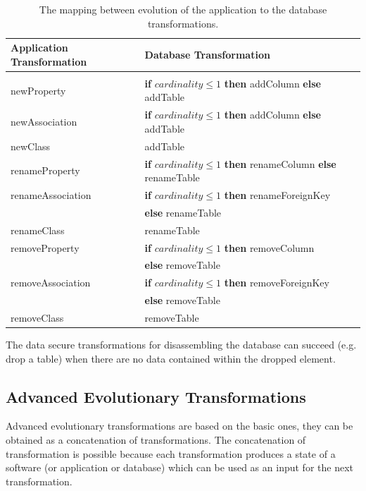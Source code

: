 \documentclass[runningheads]{comsis}
\begin{document}
\begin{table}
	\caption{The mapping between evolution of the application to the database transformations.}
	\label{tab:sw-basic-evolution}
\centering
	\begin{tabular}{ll}
		\hline
	Application Transformation & Database Transformation \\
	\hline
	\\[-2ex] 
	newProperty & \textbf{if} $cardinality \leq 1$ \textbf{then} addColumn \textbf{else} addTable \\ 

	newAssociation & \textbf{if} $cardinality \leq 1$ \textbf{then} addColumn  \textbf{else} addTable \\

	newClass & addTable \\
	renameProperty & \textbf{if} $cardinality \leq 1$ \textbf{then}  renameColumn  \textbf{else} renameTable \\

	renameAssociation & \textbf{if} $cardinality \leq 1$ \textbf{then} renameForeignKey \\ & \hspace{1in} \textbf{else} renameTable \\
	
	renameClass & renameTable \\
	removeProperty & \textbf{if} $cardinality \leq 1$ \textbf{then} removeColumn  \\ & \hspace{1in}\textbf{else} removeTable \\
	
	removeAssociation & \textbf{if} $cardinality \leq 1$ \textbf{then}  removeForeignKey \\ & \hspace{1in} \textbf{else} removeTable \\

	removeClass & removeTable\\
	\hline
	\end{tabular}
\end{table}





The data secure transformations for disassembling the database can succeed (e.g. drop a table) when there are no data contained within the dropped element.


\subsection{Advanced Evolutionary Transformations}
\label{sec:sw-adv-evolution}
Advanced evolutionary transformations are based on the basic ones, they can be obtained as a concatenation of transformations. The concatenation of transformation is possible because each transformation produces a state of a software (or application or database) which can be used as an input for the next transformation. 
\end{document}
